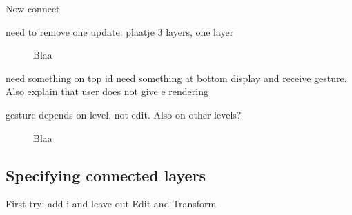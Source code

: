 Now connect

need to remove one update: plaatje 3 layers, one layer

\begin{figure}\begin{small}\begin{center}\begin{center}
\end{center}
\caption{Blaa}\label{connectingLayers} 
\end{center}\end{small}\end{figure}



need something on top id
need something at bottom display and receive gesture. Also explain that user does not give e rendering

gesture depends on level, not edit. Also on other levels?


\begin{figure}\begin{small}\begin{center}\begin{center}
\end{center}
\caption{Blaa}\label{topAndBottom} 
\end{center}\end{small}\end{figure}


\subsection{Specifying connected layers}

First try: add i and leave out Edit and Transform

